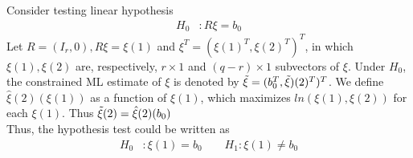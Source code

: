 \documentclass{article}
\begin{document}
Consider testing linear hypothesis
\begin{align*}
    H_0 &: R \xi = b_0
\end{align*}
Let $R=(I_r, 0), R \xi = \xi{(1)}$ and $\xi^T = (\xi{(1)}^T, \xi(2)^T)^T$, in which $\xi(1), \xi(2)$ are, respectively, $r \times 1$ and $(q-r) \times 1$ subvectors of $\xi$. Under $H_0$, the constrained ML estimate of $\xi$ is denoted by $\Tilde{\xi} = (b_0^T, \Tilde{\xi})(2)^T)^T$. We define $\hat{\xi}(2)(\xi(1))$ as a function of $\xi(1)$, which maximizes $ln(\xi(1), \xi(2))$ for each $\xi(1)$. Thus $\Tilde{\xi}(2) = \hat{\xi}(2)(b_0)$\\
Thus, the hypothesis test could be written as
\begin{align*}
    H_0 &: \xi(1) = b_0 \qquad  H_1 : \xi(1) \neq b_0
\end{align*}
\end{document}
